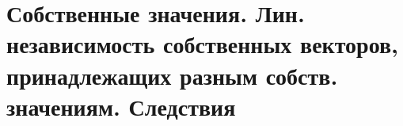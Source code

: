 \section{Собственные значения. Лин. независимость собственных векторов, принадлежащих разным собств. значениям. Следствия}
